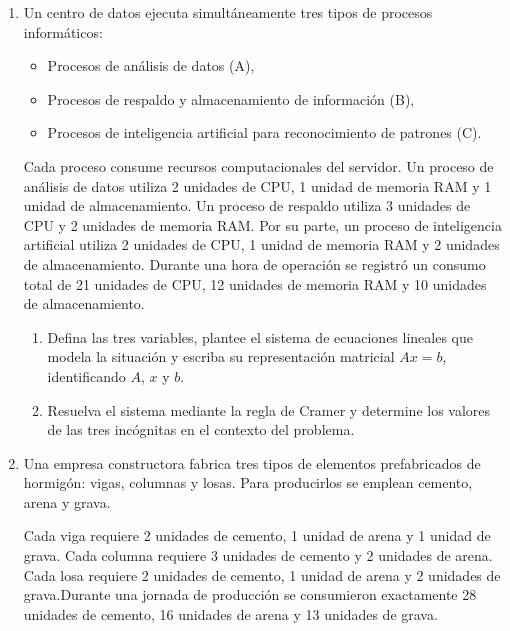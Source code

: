 \documentclass[11pt,a4paper]{article}
\begin{document}
\begin{enumerate}
\begin{enumerate}
\item Defina las tres variables, plantee el sistema de ecuaciones lineales que modela la situación y escriba su representación matricial $Ax=b$, identificando $A$, $x$ y $b$.
\item Resuelva el sistema mediante el método de la matriz inversa y determine los valores de las tres incógnitas en el contexto del problema.
\end{enumerate}

\item Un centro de datos ejecuta simultáneamente tres tipos de
procesos informáticos:

\begin{itemize}
\item Procesos de análisis de datos (A),
\item Procesos de respaldo y almacenamiento de información (B),
\item Procesos de inteligencia artificial para reconocimiento de patrones (C).
\end{itemize}

Cada proceso consume recursos computacionales del servidor.
Un proceso de análisis de datos utiliza 2 unidades de CPU,
1 unidad de memoria RAM y 1 unidad de almacenamiento.
Un proceso de respaldo utiliza 3 unidades de CPU y 2 unidades
de memoria RAM. Por su parte, un proceso de inteligencia
artificial utiliza 2 unidades de CPU, 1 unidad de memoria RAM
y 2 unidades de almacenamiento. Durante una hora de operación se registró un consumo total de 21 unidades de CPU, 12 unidades de memoria RAM y
10 unidades de almacenamiento.

\begin{enumerate}
\item Defina las tres variables, plantee el sistema de ecuaciones
lineales que modela la situación y escriba su representación
matricial $Ax=b$, identificando $A$, $x$ y $b$.

\item Resuelva el sistema mediante la regla de Cramer y determine los valores de las tres incógnitas
en el contexto del problema.
\end{enumerate}

\item Una empresa constructora fabrica tres tipos de elementos
prefabricados de hormigón: vigas, columnas y losas.
Para producirlos se emplean cemento, arena y grava.

Cada viga requiere 2 unidades de cemento, 1 unidad de arena
y 1 unidad de grava. Cada columna requiere 3 unidades de
cemento y 2 unidades de arena. Cada losa requiere 2 unidades
de cemento, 1 unidad de arena y 2 unidades de grava.Durante una jornada de producción se consumieron exactamente 28 unidades de cemento, 16 unidades de arena y
13 unidades de grava.


\end{enumerate}
\end{document}
